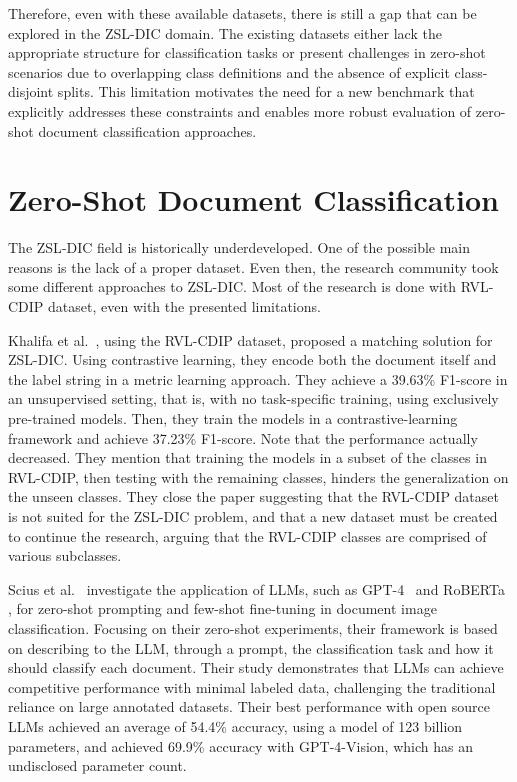 Therefore, even with these available datasets, there is still a gap that can be explored in the \gls{ZSL}-\gls{DIC} domain. The existing datasets either lack the appropriate structure for classification tasks or present challenges in zero-shot scenarios due to overlapping class definitions and the absence of explicit class-disjoint splits. This limitation motivates the need for a new benchmark that explicitly addresses these constraints and enables more robust evaluation of zero-shot document classification approaches.

\section{Zero-Shot Document Classification}
\label{sec:zsl-related}

The \gls{ZSL}-\gls{DIC} field is historically underdeveloped. One of the possible main reasons is the lack of a proper dataset. Even then, the research community took some different approaches to \gls{ZSL}-\gls{DIC}. Most of the research is done with \gls{RVL-CDIP} dataset, even with the presented limitations.

Khalifa et al.~\cite{khalifa_contrastive_2023}, using the \gls{RVL-CDIP} dataset, proposed a matching solution for \gls{ZSL}-\gls{DIC}. Using contrastive learning, they encode both the document itself and the label string in a metric learning approach. They achieve a 39.63\% F1-score in an unsupervised setting, that is, with no task-specific training, using exclusively pre-trained models. Then, they train the models in a contrastive-learning framework and achieve 37.23\% F1-score. Note that the performance actually decreased. They mention that training the models in a subset of the classes in RVL-CDIP, then testing with the remaining classes, hinders the generalization on the unseen classes. They close the paper suggesting that the \gls{RVL-CDIP} dataset is not suited for the \gls{ZSL}-\gls{DIC} problem, and that a new dataset must be created to continue the research, arguing that the RVL-CDIP classes are comprised of various subclasses.

Scius et al.~\cite{scius-bertrand_zero-shot_2025} investigate the application of \glspl{LLM}, such as GPT-4~\cite{openai_gpt-4_2024} and RoBERTa \cite{liu_roberta_2019}, for zero-shot prompting and few-shot fine-tuning in document image classification. Focusing on their zero-shot experiments, their framework is based on describing to the \gls{LLM}, through a prompt, the classification task and how it should classify each document. Their study demonstrates that \glspl{LLM} can achieve competitive performance with minimal labeled data, challenging the traditional reliance on large annotated datasets. Their best performance with open source \glspl{LLM} achieved an average of 54.4\% accuracy, using a model of 123 billion parameters, and achieved 69.9\% accuracy with GPT-4-Vision, which has an undisclosed parameter count.

